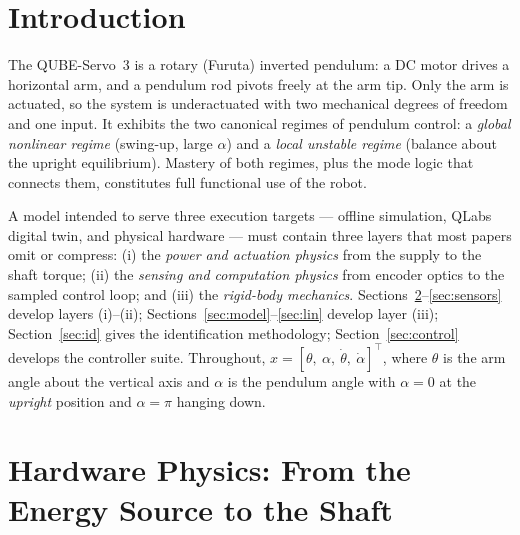 \documentclass[conference]{IEEEtran}
\begin{document}
\section{Introduction}
The QUBE-Servo~3 is a rotary (Furuta) inverted pendulum: a DC motor drives a horizontal arm, and a pendulum rod pivots freely at the arm tip. Only the arm is actuated, so the system is underactuated with two mechanical degrees of freedom and one input. It exhibits the two canonical regimes of pendulum control: a \emph{global nonlinear regime} (swing-up, large $\alpha$) and a \emph{local unstable regime} (balance about the upright equilibrium). Mastery of both regimes, plus the mode logic that connects them, constitutes full functional use of the robot.

A model intended to serve three execution targets --- offline simulation, QLabs digital twin, and physical hardware --- must contain three layers that most papers omit or compress: (i) the \emph{power and actuation physics} from the supply to the shaft torque; (ii) the \emph{sensing and computation physics} from encoder optics to the sampled control loop; and (iii) the \emph{rigid-body mechanics}. Sections~\ref{sec:hw}--\ref{sec:sensors} develop layers (i)--(ii); Sections~\ref{sec:model}--\ref{sec:lin} develop layer (iii); Section~\ref{sec:id} gives the identification methodology; Section~\ref{sec:control} develops the controller suite. Throughout, $x=[\theta,\ \alpha,\ \dot\theta,\ \dot\alpha]^{\!\top}$, where $\theta$ is the arm angle about the vertical axis and $\alpha$ is the pendulum angle with $\alpha=0$ at the \emph{upright} position and $\alpha=\pi$ hanging down.

\section{Hardware Physics: From the Energy Source to the Shaft}\label{sec:hw}
\end{document}
